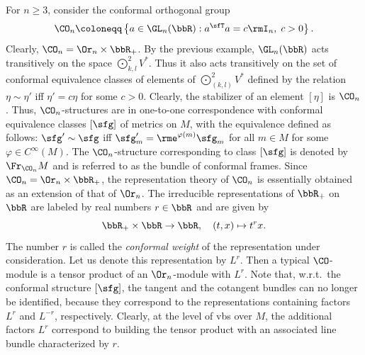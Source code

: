 \begin{example}
    For $n\geq 3$, consider the conformal orthogonal group 
    \[\CO_n\coloneqq \left\{a\in\GL_n(\bbR):a^\sfT a=c\rmI_n,\; c>0\right\}.\]
    Clearly, $\CO_n=\Or_n\times\bbR_+$. By the previous example, $\GL_n(\bbR)$ acts transitively on the space $\bigodot\nolimits^2_{k,l}V^\ast$. Thus it also acts transitively on the set of conformal equivalence classes of elements of $\bigodot\nolimits^2_{(k,l)}V^\ast$ defined by the relation $\eta\sim\eta'$ iff $\eta'=c\eta$ for some $c>0$. Clearly, the stabilizer of an element $[\eta]$ is $\CO_n$. Thus, $\CO_n$-structures are in one-to-one correspondence with conformal equivalence classes $[\sfg]$ of metrics on $M$, with the equivalence defined as follows: $\sfg'\sim\sfg$ iff $\sfg'_m=\rme^{\varphi(m)}\sfg_m$ for all $m\in M$ for some $\varphi\in C^\infty(M)$. The $\CO_n$-structure corresponding to class $[\sfg]$ is denoted by $\Fr_{\CO_n}M$ and is referred to as the bundle of conformal frames.
    Since $\CO_n=\Or_n\times\bbR_+$, the representation theory of $\CO_n$ is essentially obtained as an extension of that of $\Or_n$. The irreducible representations of $\bbR_+$ on $\bbR$ are labeled by real numbers $r\in\bbR$ and are given by 
    \[\bbR_+\times\bbR\to \bbR,\quad (t,x)\mapsto t^r x.\]
    The number $r$ is called the \emph{conformal weight} of the representation under consideration. Let us denote this representation by $L^r$. Then a typical $\CO$-module is a tensor product of an $\Or_n$-module with $L^r$. Note that, w.r.t.\ the conformal structure $[\sfg]$, the tangent and the cotangent bundles can no longer be identified, because they correspond to the representations containing factors $L^r$ and $L^{-r}$, respectively. Clearly, at the level of \glspl{vb} over $M$, the additional factors $L^r$ correspond to building the tensor product with an associated line bundle characterized by $r$.


\end{example}
